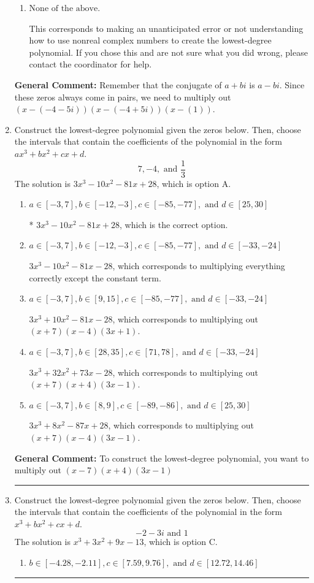 \documentclass{extbook}[14pt]
\newcommand{\litem}[1]{\item #1

\rule{\textwidth}{0.4pt}}
\begin{document}
\begin{enumerate}
{\begin{enumerate}[label=\Alph*.]
* $x^{3} +7 x^{2} +33 x -41$, which is the correct option.
\item \( \text{None of the above.} \)

This corresponds to making an unanticipated error or not understanding how to use nonreal complex numbers to create the lowest-degree polynomial. If you chose this and are not sure what you did wrong, please contact the coordinator for help.
\end{enumerate}

\textbf{General Comment:} Remember that the conjugate of $a+bi$ is $a-bi$. Since these zeros always come in pairs, we need to multiply out $(x-(-4 - 5 i))(x-(-4 + 5 i))(x-(1))$.
}
\litem{
Construct the lowest-degree polynomial given the zeros below. Then, choose the intervals that contain the coefficients of the polynomial in the form $ax^3+bx^2+cx+d$.
\[ 7, -4, \text{ and } \frac{1}{3} \]The solution is \( 3x^{3} -10 x^{2} -81 x + 28 \), which is option A.\begin{enumerate}[label=\Alph*.]
\item \( a \in [-3, 7], b \in [-12, -3], c \in [-85, -77], \text{ and } d \in [25, 30] \)

* $3x^{3} -10 x^{2} -81 x + 28$, which is the correct option.
\item \( a \in [-3, 7], b \in [-12, -3], c \in [-85, -77], \text{ and } d \in [-33, -24] \)

$3x^{3} -10 x^{2} -81 x -28$, which corresponds to multiplying everything correctly except the constant term.
\item \( a \in [-3, 7], b \in [9, 15], c \in [-85, -77], \text{ and } d \in [-33, -24] \)

$3x^{3} +10 x^{2} -81 x -28$, which corresponds to multiplying out $(x + 7)(x -4)(3x + 1)$.
\item \( a \in [-3, 7], b \in [28, 35], c \in [71, 78], \text{ and } d \in [-33, -24] \)

$3x^{3} +32 x^{2} +73 x -28$, which corresponds to multiplying out $(x + 7)(x + 4)(3x -1)$.
\item \( a \in [-3, 7], b \in [8, 9], c \in [-89, -86], \text{ and } d \in [25, 30] \)

$3x^{3} +8 x^{2} -87 x + 28$, which corresponds to multiplying out $(x + 7)(x -4)(3x -1)$.
\end{enumerate}

\textbf{General Comment:} To construct the lowest-degree polynomial, you want to multiply out $(x -7)(x + 4)(3x -1)$
}
\litem{
Construct the lowest-degree polynomial given the zeros below. Then, choose the intervals that contain the coefficients of the polynomial in the form $x^3+bx^2+cx+d$.
\[ -2 - 3 i \text{ and } 1 \]The solution is \( x^{3} +3 x^{2} +9 x -13 \), which is option C.\begin{enumerate}[label=\Alph*.]
\item \( b \in [-4.28, -2.11], c \in [7.59, 9.76], \text{ and } d \in [12.72, 14.46] \)


\end{enumerate}}
\end{enumerate}
\end{document}
